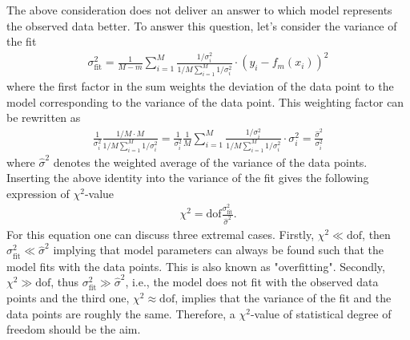 The above consideration does not deliver an answer to which model represents the observed data better. To answer this question, let's 
consider the variance of the fit
\begin{align*}
    \sigma_\mathrm{fit}^2=\frac{1}{M\!-\!m}\sum_{i=1}^M\frac{1/\sigma_i^2}{1/M\sum_{i=1}^M1/\sigma_i^2}\!\cdot\!(y_i\!-\!f_m(x_i))^2
\end{align*}
where the first factor in the sum weights the deviation of the data point to the model corresponding to the variance of the data point. This
weighting factor can be rewritten as 
\begin{align*}
    \frac{1}{\sigma_i^2}\frac{1/M\cdot M}{1/M\sum_{i=1}^M1/\sigma_i^2}
    =\frac{1}{\sigma_i^2}\frac{1}{M}\sum_{i=1}^M\frac{1/\sigma_i^2}{1/M\sum_{i=1}^M1/\sigma_i^2}\!\cdot\!\sigma_i^2
    =\frac{\hat{\sigma}^2}{\sigma_i^2}
\end{align*}
where $\hat{\sigma}^2$ denotes the weighted average of the variance of the data points. Inserting the above identity into the
variance of the fit gives the following expression of $\chi^2$-value
\begin{align*}
    \chi^2=\mathrm{dof}\frac{\sigma_\mathrm{fit}^2}{\hat{\sigma}^2}.
\end{align*}
For this equation one can discuss three extremal cases. Firstly, $\chi^2\ll\mathrm{dof}$, then $\sigma_\mathrm{fit}^2\ll\hat{\sigma}^2$ implying 
that model parameters can always be found such that the model fits with the data points. This is also known as "overfitting". Secondly, $\chi^2\gg\mathrm{dof}$,
thus $\sigma_\mathrm{fit}^2\gg\hat{\sigma}^2$, i.e., the model does not fit with the observed
data points and the third one, $\chi^2\approx\mathrm{dof}$, implies that the variance of the fit and the data points are roughly the same. Therefore, 
a $\chi^2$-value of statistical degree of freedom should be the aim.~\cite[p.194]{Bevington2003} 
